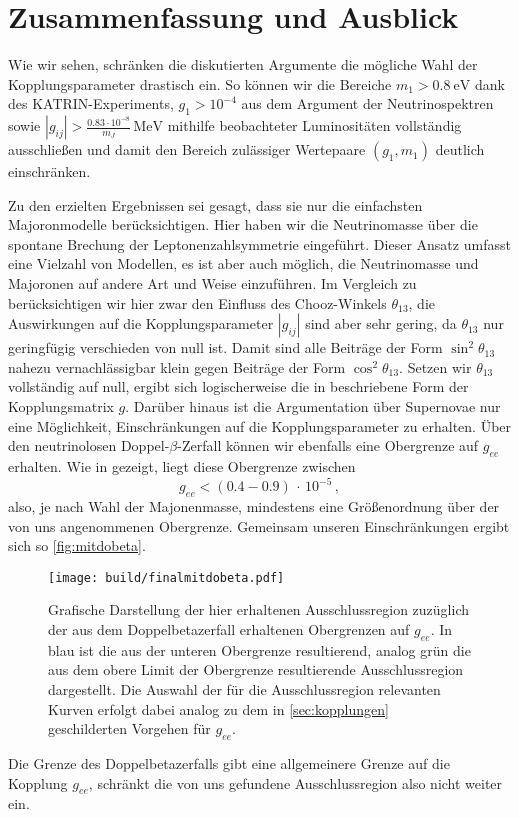 \chapter{Zusammenfassung und Ausblick}

Wie wir sehen, schränken die diskutierten Argumente die mögliche Wahl der Kopplungsparameter drastisch ein.
So können wir die Bereiche $m_1 > \SI{0.8}{\eV}$ dank des KATRIN-Experiments, $g_1 > 10^{-4}$ aus dem Argument der Neutrinospektren sowie $|g_{i j}| > \frac{\num{0.83} \cdot 10^{-8}}{m_J} \,\si{\mega\eV}$
mithilfe beobachteter Luminositäten vollständig ausschließen und damit den Bereich zulässiger Wertepaare
$(g_1,m_1)$ deutlich einschränken.

Zu den erzielten Ergebnissen sei gesagt, dass sie nur die einfachsten Majoronmodelle berücksichtigen.
Hier haben wir die Neutrinomasse über die spontane Brechung der Leptonenzahlsymmetrie eingeführt.
Dieser Ansatz umfasst eine Vielzahl von Modellen, es ist aber auch möglich, die Neutrinomasse und Majoronen auf andere Art und Weise einzuführen.
Im Vergleich zu \cite{päspaper} berücksichtigen wir hier zwar den Einfluss des Chooz-Winkels $\theta_{1 3}$, die Auswirkungen auf die Kopplungsparameter $|g_{i j}|$ sind aber sehr gering, da $\theta_{13}$ nur geringfügig verschieden von null ist.
Damit sind alle Beiträge der Form $\sin^2 \theta_{13}$ nahezu vernachlässigbar klein gegen Beiträge der Form $\cos^2\theta_{13}$.
Setzen wir $\theta_{13}$ vollständig auf null, ergibt sich logischerweise die in \cite{päspaper} beschriebene Form der Kopplungsmatrix $g$.
Darüber hinaus ist die Argumentation über Supernovae nur eine Möglichkeit, Einschränkungen auf die Kopplungsparameter zu erhalten.
Über den neutrinolosen Doppel-$\beta$-Zerfall können wir ebenfalls eine Obergrenze auf $g_{ee}$ erhalten.
Wie in \cite{hauhau} gezeigt, liegt diese Obergrenze zwischen
\begin{equation}
    g_{ee} < \left(\num{0.4} - \num{0.9}\right) \, \cdot \, 10^{-5} \,,
    \label{eq:g_eedoppelbeta}
\end{equation} 
also, je nach Wahl der Majonenmasse, mindestens eine Größenordnung über der von uns angenommenen Obergrenze.
Gemeinsam unseren Einschränkungen ergibt sich so \autoref{fig:mitdobeta}.
\begin{figure}[H]
    \centering
    \texttt{[image: build/finalmitdobeta.pdf]}
    \caption{Grafische Darstellung der hier erhaltenen Ausschlussregion zuzüglich der aus dem Doppelbetazerfall erhaltenen Obergrenzen auf $g_{ee}$. In blau ist die aus der unteren Obergrenze resultierend, 
    analog grün die aus dem obere Limit der Obergrenze resultierende Ausschlussregion dargestellt. Die Auswahl der für die Ausschlussregion relevanten Kurven erfolgt dabei analog zu dem in \autoref{sec:kopplungen}
    geschilderten Vorgehen für $g_{ee}$.}
    \label{fig:mitdobeta}
\end{figure}
Die Grenze des Doppelbetazerfalls gibt eine allgemeinere Grenze auf die Kopplung $g_{ee}$, schränkt die von uns gefundene Ausschlussregion also nicht weiter ein.

